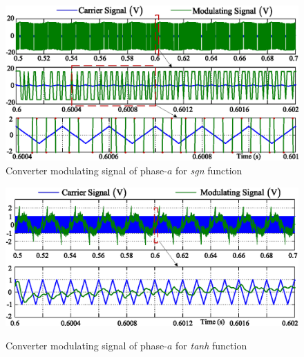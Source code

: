\begin{figure}[h!] 
		\centering
		\includegraphics[scale=0.9]{figures/Chapter_4/Mine/Chattering_simulation1.eps}
		\caption{Converter modulating signal of phase-$a$ for \textit{sgn} function}
		\label{4.sign}
\end{figure}
\begin{figure}[h!] 	
		\centering
		\includegraphics[scale=0.9]{figures/Chapter_4/Mine/Chattering_simulation.eps}
		\label{4.tanh}
	\caption{Converter modulating signal of phase-$a$ for \textit{tanh} function} 
	\label{4.signtanh}
\end{figure} 

